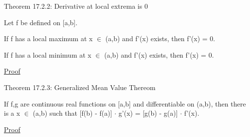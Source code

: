     \vspace{0.5cm}

{ \color{red} Theorem 17.2.2: Derivative at local extrema is 0 }

    \begin{adjustbox}{minipage=14cm, right, vspace=0.1cm 0cm}
        Let f be defined on [a,b].
        
        If f has a local maximum at x $\in$ (a,b) and f'(x) exists, then
        f'(x) = 0.

        If f has a local minimum at x $\in$ (a,b) and f'(x) exists, then
        f'(x) = 0.
    \end{adjustbox}

{ \color{magenta} \underline{Proof} }


    \vspace{0.5cm}

{ \color{red} Theorem 17.2.3: Generalized Mean Value Thereom }

    \begin{adjustbox}{minipage=14cm, right, vspace=0.1cm 0cm}
        If f,g are continuous real functions on [a,b] and differentiable on
        (a,b), then there is a x $\in$ (a,b) such that
        [f(b) - f(a)] $\cdot$ g'(x) = [g(b) - g(a)] $\cdot$ f'(x).
    \end{adjustbox}

{ \color{magenta} \underline{Proof} }

